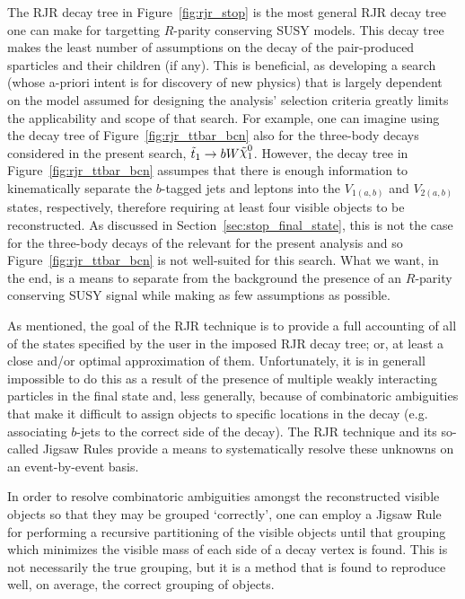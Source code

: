 The RJR decay tree in Figure~\ref{fig:rjr_stop} is the most general RJR decay tree one can make for
targetting $R$-parity conserving SUSY models.
This decay tree makes the least number of assumptions on the decay of the pair-produced sparticles and
their children (if any).
This is beneficial, as developing a search (whose a-priori intent is for discovery of new physics)
that is largely dependent on the model assumed for designing the analysis' selection criteria
greatly limits the applicability and scope of that search.
For example, one can imagine using the decay tree of Figure~\ref{fig:rjr_ttbar_bcn} also for the three-body
decays considered in the present search, $\stopone \rightarrow b W \ninoone$.
However, the decay tree in Figure~\ref{fig:rjr_ttbar_bcn} assumpes that there is enough information to
kinematically separate the $b$-tagged jets and leptons into the $V_{1(a,b)}$ and $V_{2(a,b)}$ states,
respectively, therefore requiring at least four visible objects to be reconstructed.
As discussed in Section~\ref{sec:stop_final_state}, this is not the case for the three-body decays
of the \stopone relevant for the present analysis and so Figure~\ref{fig:rjr_ttbar_bcn} is not well-suited
for this search.
What we want, in the end, is a means to separate from the background the presence of an $R$-parity conserving
SUSY signal while making as few assumptions as possible.

As mentioned, the goal of the RJR technique is to provide a full accounting of all of the states specified by the
user in the imposed RJR decay tree; or, at least a close and/or optimal approximation of them.
Unfortunately, it is in generall impossible to do this as a result of the presence of multiple weakly interacting
particles in the final state and, less generally, because of combinatoric ambiguities
that make it difficult to assign objects to specific locations in the decay (e.g. associating $b$-jets to
the correct side of the decay).
The RJR technique and its so-called Jigsaw Rules provide a means to systematically resolve these unknowns
on an event-by-event basis.

In order to resolve combinatoric ambiguities amongst the reconstructed visible objects so that they may
be grouped `correctly', one can employ a Jigsaw Rule for performing a recursive partitioning
of the visible objects until that grouping which minimizes the visible mass of each side of a decay vertex is found.
This is not necessarily the true grouping, but it is a method that is found to reproduce well, on average,
the correct grouping of objects.

